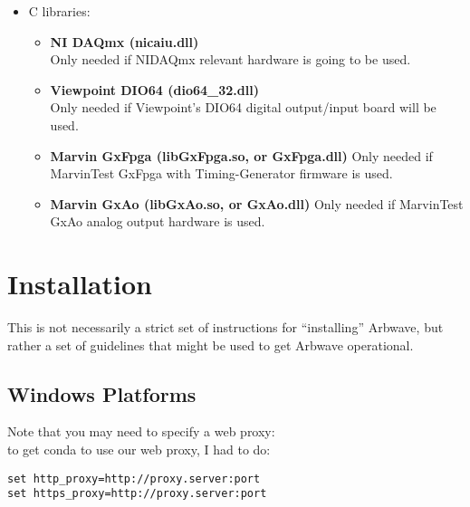 \begin{itemize}
  \item C libraries:
    \begin{itemize}
    \item \textbf{NI DAQmx (nicaiu.dll)} \\
      Only needed if NIDAQmx relevant hardware is going to be used.
    \item \textbf{Viewpoint DIO64 (dio64\_32.dll)} \\
      Only needed if Viewpoint's DIO64 digital output/input board will be used.
    \item \textbf{Marvin GxFpga (libGxFpga.so, or GxFpga.dll)}
      Only needed if MarvinTest GxFpga with  Timing-Generator
      firmware is used.
    \item \textbf{Marvin GxAo (libGxAo.so, or GxAo.dll)}
      Only needed if MarvinTest GxAo analog output hardware is used.
    \end{itemize}
\end{itemize}

\section{Installation}
This is not necessarily a strict set of instructions for ``installing'' Arbwave,
but rather a set of guidelines that might be used to get Arbwave operational.

\subsection{Windows Platforms}

Note that you may need to specify a web proxy:\\
to get conda to use our web proxy, I had to do:
\begin{verbatim}
set http_proxy=http://proxy.server:port
set https_proxy=http://proxy.server:port
\end{verbatim}


